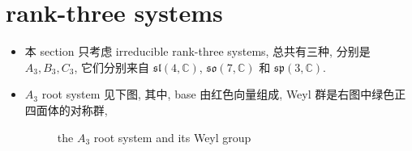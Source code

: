 \section{rank-three systems}
\begin{itemize}
	\item 本 section 只考虑 irreducible rank-three systems, 总共有三种, 分别是 $A_3, B_3, C_3$, 它们分别来自 $\mathfrak{sl}(4, \mathbb{C})$, $\mathfrak{so}(7, \mathbb{C})$ 和 $\mathfrak{sp}(3, \mathbb{C})$.
	
	\item $A_3$ root system 见下图, 其中, base 由红色向量组成, Weyl 群是右图中绿色正四面体的对称群,
	
	\begin{figure}[H]
		\centering
		\caption{the $A_3$ root system and its Weyl group}
	\end{figure}
	

\end{itemize}
